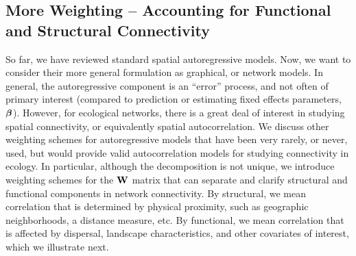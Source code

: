 \documentclass[11pt, titlepage]{article}\usepackage[]{graphicx}\usepackage[]{color}
\begin{document}
\begin{spacing}{1.9}
\begin{flushleft}

\subsection*{More Weighting -- Accounting for Functional and Structural Connectivity}

So far, we have reviewed standard spatial autoregressive models. Now, we want to consider their more general formulation as graphical, or network models. In general, the autoregressive component is an ``error'' process, and not often of primary interest (compared to prediction or estimating fixed effects parameters, $\mbox{\boldmath $\beta$}$).  However, for ecological networks, there is a great deal of interest in studying spatial connectivity, or equivalently spatial autocorrelation. We discuss other weighting schemes for autoregressive models that have been very rarely, or never, used, but would provide valid autocorrelation models for studying connectivity in ecology.  In particular, although the decomposition is not unique, we introduce weighting schemes for the $\mathbf{W}$ matrix that can separate and clarify structural and functional components in network connectivity.  By structural, we mean correlation that is determined by physical proximity, such as geographic neighborhoods, a distance measure, etc.  By functional, we mean correlation that is affected by dispersal, landscape characteristics, and other covariates of interest, which we illustrate next.


\end{flushleft}
\end{spacing}
\end{document}
